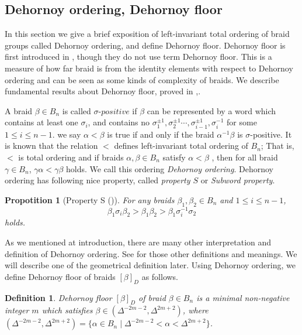 \documentclass[12pt]{amsart}
\newtheorem{defn}{Definition}
\newtheorem{prop}{Propotition}
\begin{document}
\subsection{Dehornoy ordering, Dehornoy floor}


   In this section we give a brief exposition of left-invariant total ordering of braid groups called Dehornoy ordering, and define Dehornoy floor. Dehornoy floor is first introduced in \cite{mn}, though they do not use term Dehornoy floor. This is a measure of how far braid is from the identity elements with respect to Dehornoy ordering and can be seen as some kinds of complexity of braids. 
We describe fundamental results about Dehornoy floor, proved in \cite{mn},\cite{ma}. 

   A braid $\beta \in B_{n}$ is called $\sigma$-$positive$ if $\beta$ can be represented by a word which contains at least one $\sigma_{i}$, and contains no $\sigma_{1}^{\pm1},\sigma_{2}^{\pm1}\cdots,\sigma_{i-1}^{\pm 1},\sigma_{i}^{-1}$ for some $1\leq i \leq n-1$. 
we say $\alpha < \beta$ is true if and only if the braid $\alpha^{-1}\beta$ is $\sigma$-positive.
It is known that the relation $<$ defines left-invariant total ordering of $B_{n}$; That is, $<$ is total ordering and if braids $\alpha,\beta \in B_{n}$ satisfy $\alpha < \beta $ , then for all braid $\gamma \in B_{n}$, $\gamma \alpha < \gamma \beta$ holds.  
We call this ordering {\it Dehornoy ordering}. 
   Dehornoy ordering has following nice property, called {\it property $S$} or {\it Subword property}.
   
\begin{prop}[Property S (\cite{ddrw})]
\label{prop:Property-S}
For any braids $\beta_{1},\beta_{2} \in B_{n}$ and $1\leq i \leq n-1$,
\[ \beta_{1}\sigma_{i}\beta_{2} > \beta_{1}\beta_{2} > \beta_{1}\sigma_{i}^{-1}\sigma_{2} \]
holds. 
\end{prop}

   As we mentioned at introduction, there are many other interpretation and definition of Dehornoy ordering. See \cite{ddrw} for those other definitions and meanings. We will describe one of the geometrical definition later.  
Using Dehornoy ordering, we define Dehornoy floor of braids $[\beta]_{D}$ as follows.

\begin{defn}
  Dehornoy floor $[\beta]_{D}$ of braid $\beta \in B_{n}$ is a minimal non-negative integer $m$ which satisfies
  $\beta \in (\Delta^{-2m-2},\Delta^{2m+2})$, where $(\Delta^{-2m-2},\Delta^{2m+2})= \{ \alpha \in B_{n} \;| \; \Delta^{-2m-2} < \alpha  <\Delta^{2m+2} \}$. 
\end{defn}
\end{document}
